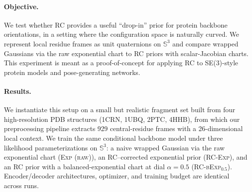 \documentclass{article}
\theoremstyle{definition}
\theoremstyle{remark}
\newcommand{\SSS}{\mathbb{S}}
\begin{document}
\paragraph{Objective.}
We test whether RC provides a useful ``drop-in'' prior for protein
backbone orientations, in a setting where the configuration space is
naturally curved.  We represent local residue frames as unit quaternions
on $\SSS^3$ and compare wrapped Gaussians via the raw exponential chart to
RC priors with scalar-Jacobian charts.  This experiment is meant as a
proof-of-concept for applying RC to SE(3)-style protein models and
pose-generating networks.

\paragraph{Results.}
We instantiate this setup on a small but realistic fragment set built from four
high-resolution PDB structures (1CRN, 1UBQ, 2PTC, 4HHB), from which our
preprocessing pipeline extracts 929 central-residue frames with a
26-dimensional local context. We train the same conditional backbone model
under three likelihood parameterizations on $\SSS^3$: a naive wrapped Gaussian
via the raw exponential chart (\textsc{Exp (raw)}), an RC--corrected
exponential prior (\textsc{RC-Exp}), and an RC prior with a
balanced-exponential chart at dial $\alpha = 0.5$ (\textsc{RC-bExp}$_{0.5}$).
Encoder/decoder architectures, optimizer, and training budget are identical
across runs.
\end{document}
